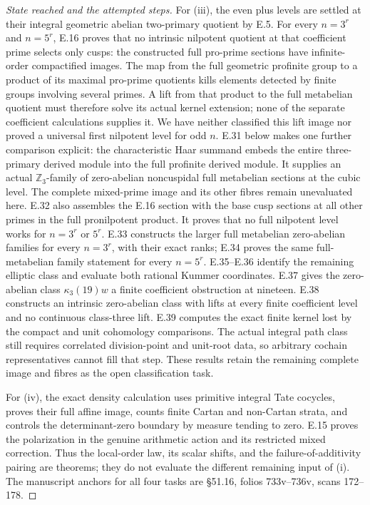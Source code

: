 \begin{proof}[State reached and the attempted steps]
For (iii), the even plus levels are settled
at their integral geometric abelian
two-primary quotient by E.5. For every
$n=3^r$ and $n=5^r$, E.16 proves that no
intrinsic nilpotent quotient at that
coefficient prime selects only cusps:
the constructed full pro-prime sections
have infinite-order compactified images.
The map from the full geometric profinite
group to a product of its maximal pro-prime
quotients kills elements detected by finite
groups involving several primes. A lift
from that product to the full metabelian
quotient must therefore solve its actual
kernel extension; none of the separate
coefficient calculations supplies it.
We have neither classified this lift
image nor proved a universal first
nilpotent level for odd $n$.
E.31 below makes one further comparison explicit:
the characteristic Haar summand embeds the entire
three-primary derived module into the full
profinite derived module. It supplies an actual
$\mathbb Z_3$-family of zero-abelian noncuspidal
full metabelian sections at the cubic level.
The complete mixed-prime image and its other
fibres remain unevaluated here.
E.32 also assembles the E.16 section with
the base cusp sections at all other primes
in the full pronilpotent product. It proves
that no full nilpotent level works for
$n=3^r$ or $5^r$. E.33 constructs the larger
full metabelian zero-abelian families for
every $n=3^r$, with their exact ranks;
E.34 proves the same full-metabelian family
statement for every $n=5^r$. E.35--E.36
identify the remaining elliptic class and
evaluate both rational Kummer coordinates.
E.37 gives the zero-abelian class
$\kappa_3(19)w$ a finite coefficient
obstruction at nineteen. E.38 constructs an
intrinsic zero-abelian class with lifts at
every finite coefficient level and no
continuous class-three lift. E.39 computes
the exact finite kernel lost by the compact
and unit cohomology comparisons. The actual
integral path class still requires correlated
division-point and unit-root data, so arbitrary
cochain representatives cannot fill that step.
These results retain the remaining complete image and
fibres as the open classification task.

For (iv), the exact density calculation
uses primitive integral Tate cocycles,
proves their full affine image, counts
finite Cartan and non-Cartan strata,
and controls the determinant-zero
boundary by measure tending to zero.
E.15 proves the polarization in the
genuine arithmetic action and its
restricted mixed correction. Thus the
local-order law, its scalar shifts,
and the failure-of-additivity pairing
are theorems; they do not evaluate
the different remaining input of (i).
The manuscript anchors for all four
tasks are \S51.16, folios 733v--736v,
scans 172--178.
\end{proof}

